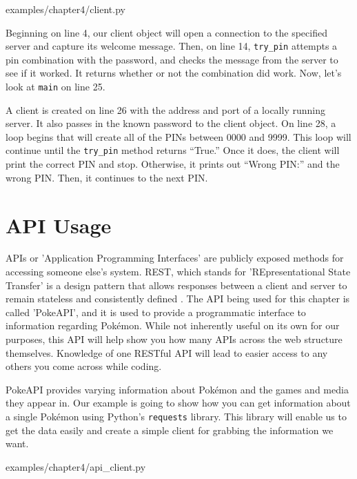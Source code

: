 \documentclass[12pt, oneside, a4paper]{book}
\begin{document}
      
      {examples/chapter4/client.py}

      Beginning on line 4, our client object will open a connection to the specified server and capture its welcome message.
      Then, on line 14, \lstinline!try_pin! attempts a pin combination with the password, and checks the message from the server to see if it worked.
      It returns whether or not the combination did work.
      Now, let's look at \lstinline!main! on line 25.

      A client is created on line 26 with the address and port of a locally running server.
      It also passes in the known password to the client object.
      On line 28, a loop begins that will create all of the PINs between 0000 and 9999.
      This loop will continue until the \lstinline!try_pin! method returns ``True.''
      Once it does, the client will print the correct PIN and stop.
      Otherwise, it prints out ``Wrong PIN:'' and the wrong PIN.
      Then, it continues to the next PIN.
      \section{API Usage}
      APIs or 'Application Programming Interfaces' are publicly exposed methods for accessing someone else's system.
      REST, which stands for 'REpresentational State Transfer' is a design pattern that allows responses between a client and server to remain stateless and consistently defined \autocite{hallettPokeAPI}.
      The API being used for this chapter is called 'PokeAPI', and it is used to provide a programmatic interface to information regarding Pokémon.
      While not inherently useful on its own for our purposes, this API will help show you how many APIs across the web structure themselves.
      Knowledge of one RESTful API will lead to easier access to any others you come across while coding.

      PokeAPI provides varying information about Pokémon and the games and media they appear in.
      Our example is going to show how you can get information about a single Pokémon using Python's \lstinline!requests! library.
      This library will enable us to get the data easily and create a simple client for grabbing the information we want.

      
      {examples/chapter4/api_client.py}
\end{document}
